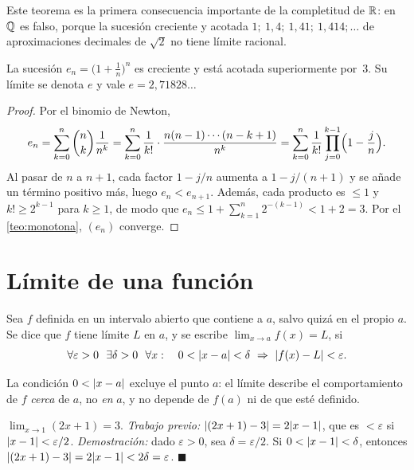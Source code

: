 Este teorema es la primera consecuencia importante de la completitud de $\mathbb{R}$: en $\mathbb{Q}$ es falso, porque la sucesión creciente y acotada $1;\ 1{,}4;\ 1{,}41;\ 1{,}414;\dots$ de aproximaciones decimales de $\sqrt2$ no tiene límite racional.

\begin{teorema}[El número $e$]\label{teo:e}
La sucesión $e_n=\bigl(1+\tfrac1n\bigr)^{n}$ es creciente y está acotada superiormente por~3. Su límite se denota $e$ y vale $e=2{,}71828\dots$
\end{teorema}

\begin{proof}
Por el binomio de Newton,
\[
e_n=\sum_{k=0}^{n}\binom{n}{k}\frac{1}{n^{k}}=\sum_{k=0}^{n}\frac{1}{k!}\cdot\frac{n(n-1)\cdots(n-k+1)}{n^{k}}=\sum_{k=0}^{n}\frac{1}{k!}\prod_{j=0}^{k-1}\Bigl(1-\frac{j}{n}\Bigr).
\]
Al pasar de $n$ a $n+1$, cada factor $1-j/n$ aumenta a $1-j/(n+1)$ y se añade un término positivo más, luego $e_n<e_{n+1}$. Además, cada producto es $\le1$ y $k!\ge2^{k-1}$ para $k\ge1$, de modo que $e_n\le1+\sum_{k=1}^{n}2^{-(k-1)}<1+2=3$. Por el \cref{teo:monotona}, $(e_n)$ converge.
\end{proof}

\section{Límite de una función}

\begin{definicion}\label{def:limite-funcion}
Sea $f$ definida en un intervalo abierto que contiene a $a$, salvo quizá en el propio $a$. Se dice que $f$ tiene límite $L$ en $a$, y se escribe $\lim_{x\to a}f(x)=L$, si
\[
\forall\varepsilon>0\ \ \exists\delta>0\ \ \forall x:\quad 0<\abs{x-a}<\delta\ \Rightarrow\ \abs{f(x)-L}<\varepsilon.
\]
\end{definicion}

La condición $0<\lvert x-a\rvert$ excluye el punto $a$: el límite describe el comportamiento de $f$ \emph{cerca} de $a$, no \emph{en} $a$, y no depende de $f(a)$ ni de que esté definido.

\begin{ejemplo}\label{ej:lineal}
$\lim_{x\to1}(2x+1)=3$. \emph{Trabajo previo:} $\lvert(2x+1)-3\rvert=2\lvert x-1\rvert$, que es $<\varepsilon$ si $\lvert x-1\rvert<\varepsilon/2$. \emph{Demostración:} dado $\varepsilon>0$, sea $\delta=\varepsilon/2$. Si $0<\lvert x-1\rvert<\delta$, entonces $\lvert(2x+1)-3\rvert=2\lvert x-1\rvert<2\delta=\varepsilon$. \hfill$\blacksquare$
\end{ejemplo}


